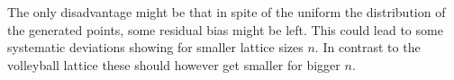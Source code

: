 The only disadvantage might be that in spite of the uniform the distribution of the generated points, some residual bias might be left. This could lead to some systematic deviations showing for smaller lattice sizes $n$. In contrast to the volleyball lattice these should however get smaller for bigger $n$.

%
%
%
%
